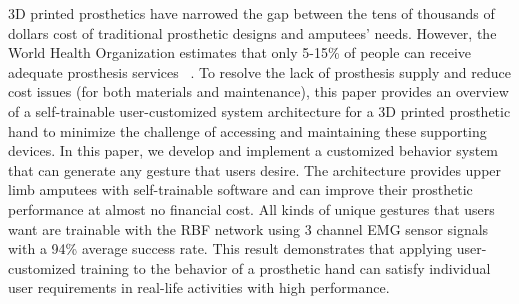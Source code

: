 \begin{abstractpage}


3D printed prosthetics have narrowed the gap between the tens of
thousands of dollars cost of traditional prosthetic designs and
amputees' needs. However, the World Health Organization estimates that
only 5-15\% of people can receive adequate prosthesis services
~\cite{WHO}. To resolve the lack of prosthesis supply and reduce cost
issues (for both materials and maintenance), this paper provides an
overview of a self-trainable user-customized system architecture for a
3D printed prosthetic hand to minimize the challenge of accessing and
maintaining these supporting devices. In this paper, we develop and
implement a customized behavior system that can generate any gesture
that users desire. The architecture provides upper limb amputees with
self-trainable software and can improve their prosthetic performance
at almost no financial cost.  All kinds of unique gestures that users
want are trainable with the RBF network using 3 channel EMG sensor
signals with a 94\% average success rate.  This result demonstrates
that applying user-customized training to the behavior of a prosthetic
hand can satisfy individual user requirements in real-life activities
with high performance.



\end{abstractpage}
